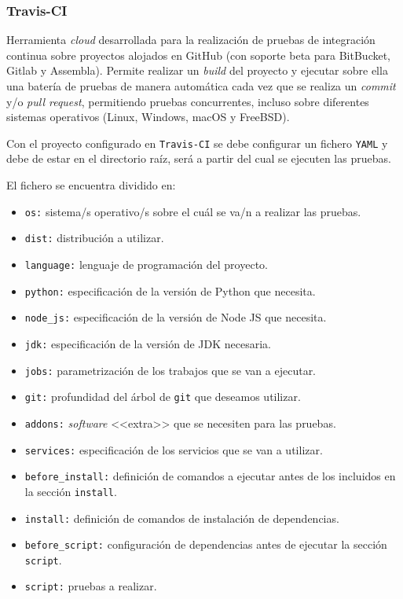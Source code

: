 
\subsubsection{Travis-CI}
Herramienta \textit{cloud} desarrollada para la realización de pruebas de integración continua sobre proyectos alojados en GitHub (con soporte beta para BitBucket, Gitlab y Assembla). Permite realizar un \textit{build} del proyecto y ejecutar sobre ella una batería de pruebas de manera automática cada vez que se realiza un \textit{commit} y/o \textit{pull request}, permitiendo pruebas concurrentes, incluso sobre diferentes sistemas operativos (Linux, Windows, macOS y FreeBSD). 

Con el proyecto configurado en \texttt{Travis-CI} se debe configurar un fichero \texttt{YAML} y debe de estar en el directorio raíz, será a partir del cual se ejecuten las pruebas.

El fichero se encuentra dividido en:
\begin{itemize}
\tightlist
\item \texttt{os:} sistema/s operativo/s sobre el cuál se va/n a realizar las pruebas.
\item \texttt{dist:} distribución a utilizar.
\item \texttt{language:} lenguaje de programación del proyecto.
\item \texttt{python:} especificación de la versión de Python que necesita.
\item \texttt{node\_js:} especificación de la versión de Node JS que necesita.
\item \texttt{jdk:} especificación de la versión de JDK necesaria.
\item \texttt{jobs:} parametrización de los trabajos que se van a ejecutar.
\item \texttt{git:} profundidad del árbol de \texttt{git} que deseamos utilizar.
\item \texttt{addons:} \textit{software} <<extra>> que se necesiten para las pruebas.
\item \texttt{services:} especificación de los servicios que se van a utilizar.
\item \texttt{before\_install:} definición de comandos a ejecutar antes de los incluidos en la sección \texttt{install}.
\item \texttt{install:} definición de comandos de instalación de dependencias.
\item \texttt{before\_script:} configuración de dependencias antes de ejecutar la sección \texttt{script}.
\item \texttt{script:} pruebas a realizar.
\end{itemize}

